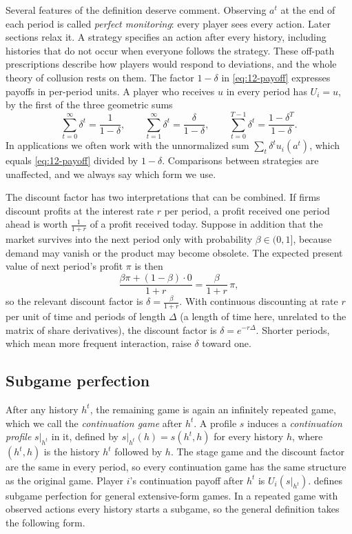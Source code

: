 Several features of the definition deserve comment. Observing $a^t$ at the end of each period is called
\emph{perfect monitoring}: every player sees every action. Later sections relax it. A strategy specifies an action
after every history, including histories that do not occur when everyone follows the strategy. These off-path
prescriptions describe how players would respond to deviations, and the whole theory of collusion rests on them. The
factor $1 - \delta$ in \eqref{eq:12-payoff} expresses payoffs in per-period units. A player who receives $u$ in every
period has $U_i = u$, by the first of the three geometric sums
\begin{equation}\label{eq:12-geometric}
\sum_{t=0}^{\infty}\delta^t = \frac{1}{1 - \delta}, \qquad
\sum_{t=1}^{\infty}\delta^t = \frac{\delta}{1 - \delta}, \qquad
\sum_{t=0}^{T-1}\delta^t = \frac{1 - \delta^T}{1 - \delta}.
\end{equation}
In applications we often work with the unnormalized sum $\sum_t\delta^t u_i(a^t)$, which equals
\eqref{eq:12-payoff} divided by $1 - \delta$. Comparisons between strategies are unaffected, and we always say which
form we use.

The discount factor has two interpretations that can be combined. If firms discount profits at the interest rate
$r$ per period, a profit received one period ahead is worth $\frac{1}{1 + r}$ of a profit received today. Suppose in
addition that the market survives into the next period only with probability $\beta \in (0, 1]$, because demand may
vanish or the product may become obsolete. The expected present value of next period's profit $\pi$ is then
\begin{equation*}
\frac{\beta\pi + (1 - \beta)\cdot 0}{1 + r} = \frac{\beta}{1 + r}\,\pi ,
\end{equation*}
so the relevant discount factor is $\delta = \frac{\beta}{1 + r}$. With continuous discounting at rate $r$ per unit of
time and periods of length $\Delta$ (a length of time here, unrelated to the matrix of share derivatives), the
discount factor is $\delta = e^{-r\Delta}$. Shorter periods, which mean more
frequent interaction, raise $\delta$ toward one.

\subsection{Subgame perfection}\label{sec:12-spe}

After any history $h^t$, the remaining game is again an infinitely repeated game, which we call the
\emph{continuation game} after $h^t$. A profile $s$ induces a \emph{continuation profile} $s|_{h^t}$ in it, defined
by $s|_{h^t}(h) = s(h^t, h)$ for every history $h$, where $(h^t, h)$ is the history $h^t$ followed by $h$. The stage
game and the discount factor are the same in every period, so every continuation game has the same structure as the
original game. Player $i$'s continuation payoff after $h^t$ is $U_i(s|_{h^t})$.  defines subgame
perfection for general extensive-form games. In a repeated game with observed actions every history starts a
subgame, so the general definition takes the following form.

